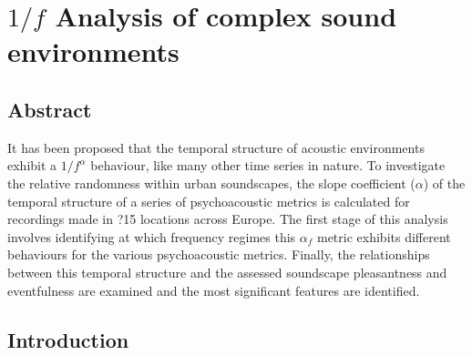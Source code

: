 \chapter{$1/f$ Analysis of complex sound environments}
\label{app:overf}


\section{Abstract}

It has been proposed that the temporal structure of acoustic environments exhibit a $1/f^\alpha$ behaviour, like many other time series in nature. To investigate the relative randomness within urban soundscapes, the slope coefficient ($\alpha$) of the temporal structure of a series of psychoacoustic metrics is calculated for recordings made in ?15 locations across Europe. The first stage of this analysis involves identifying at which frequency regimes this $\alpha_{f}$ metric exhibits different behaviours for the various psychoacoustic metrics. Finally, the relationships between this temporal structure and the assessed soundscape pleasantness and eventfulness are examined and the most significant features are identified.

\section{Introduction}




